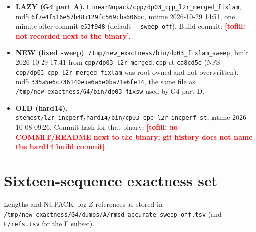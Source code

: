 \documentclass[11pt]{article}
\newcommand{\tofill}[1]{\textcolor{red}{\textbf{[tofill: #1]}}}
\begin{document}
\begin{itemize}[leftmargin=*]
  \item \textbf{LAZY (G4 part A).} \texttt{LinearNupack/cpp/dp03\_cpp\_l2r\_merged\_fixlam}, md5 \texttt{6f7e4f516e57b48b129fc569cba506bc}, mtime 2026-10-29 14:51, one minute after commit \texttt{e53f948} (default \texttt{-{}-sweep off}). Build commit: \tofill{not recorded next to the binary}.
  \item \textbf{NEW (fixed sweep).} \texttt{/tmp/new\_exactness/bin/dp03\_fixlam\_sweep}, built 2026-10-29 17:41 from \texttt{cpp/dp03\_l2r\_merged.cpp} at \texttt{ca8cd5e} (NFS \texttt{cpp/dp03\_cpp\_l2r\_merged\_fixlam} was root-owned and not overwritten). md5 \texttt{335a5e6c736140eba6a5e0ba71e6fe14}, the same file as \texttt{/tmp/new\_exactness/G4/bin/dp03\_fixsw} used by G4 part D.
  \item \textbf{OLD (hard14).} \texttt{stemest/l2r\_incperf/hard14/bin/dp03\_cpp\_l2r\_incperf\_st}, mtime 2026-10-08 09:26. Commit hash for that binary: \tofill{no COMMIT/README next to the binary; git history does not name the hard14 build commit}.
\end{itemize}

\section{Sixteen-sequence exactness set}
Lengths and NUPACK $\log Z$ references as stored in \texttt{/tmp/new\_exactness/G4/dumps/A/}\allowbreak\texttt{rmsd\_accurate\_sweep\_off.tsv} (and \texttt{F/refs.tsv} for the F subset).
\end{document}
